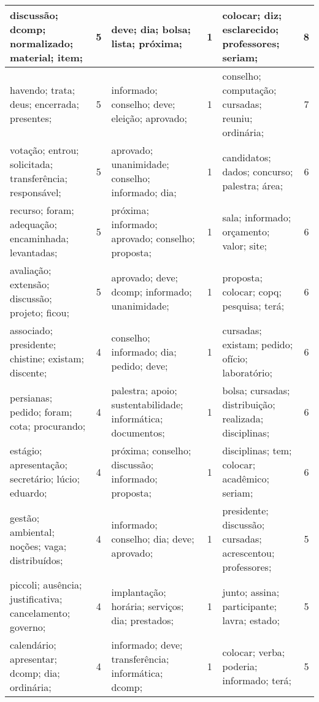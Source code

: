 \begin{table}[!h]
\begin{tabular}{|l|c||l|c||l|c|}
   discussão; dcomp; normalizado; material; item;    &   5  &         deve; dia; bolsa; lista; próxima;    &   1  &       colocar; diz; esclarecido; professores; seriam;    &   8  \\ \hline
   havendo; trata; deus; encerrada; presentes;    &   5  &         informado; conselho; deve; eleição; aprovado;    &   1  &       conselho; computação; cursadas; reuniu; ordinária;    &   7  \\ \hline
   votação; entrou; solicitada; transferência; responsável;    &   5  &         aprovado; unanimidade; conselho; informado; dia;    &   1  &       candidatos; dados; concurso; palestra; área;    &   6  \\ \hline
   recurso; foram; adequação; encaminhada; levantadas;    &   5  &         próxima; informado; aprovado; conselho; proposta;    &   1  &       sala; informado; orçamento; valor; site;    &   6  \\ \hline
   avaliação; extensão; discussão; projeto; ficou;    &   5  &         aprovado; deve; dcomp; informado; unanimidade;    &   1  &       proposta; colocar; copq; pesquisa; terá;    &   6  \\ \hline
   associado; presidente; chistine; existam; discente;    &   4  &         conselho; informado; dia; pedido; deve;    &   1  &       cursadas; existam; pedido; ofício; laboratório;    &   6  \\ \hline
   persianas; pedido; foram; cota; procurando;    &   4  &         palestra; apoio; sustentabilidade; informática; documentos;    &   1  &       bolsa; cursadas; distribuição; realizada; disciplinas;    &   6  \\ \hline
   estágio; apresentação; secretário; lúcio; eduardo;    &   4  &         próxima; conselho; discussão; informado; proposta;    &   1  &       disciplinas; tem; colocar; acadêmico; seriam;    &   6  \\ \hline
   gestão; ambiental; noções; vaga; distribuídos;    &   4  &         informado; conselho; dia; deve; aprovado;    &   1  &       presidente; discussão; cursadas; acrescentou; professores;    &   5  \\ \hline
   piccoli; ausência; justificativa; cancelamento; governo;    &   4  &         implantação; horária; serviços; dia; prestados;    &   1  &       junto; assina; participante; lavra; estado;    &   5  \\ \hline
   calendário; apresentar; dcomp; dia; ordinária;    &   4  &         informado; deve; transferência; informática; dcomp;    &   1  &       colocar; verba; poderia; informado; terá;    &   5  \\ \hline

\end{tabular}
\end{table}
